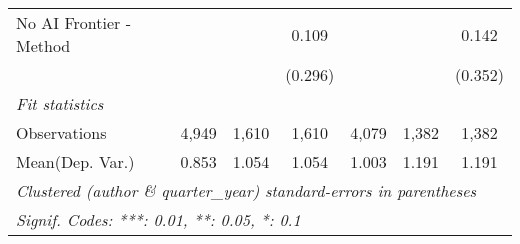 \begin{tabular}{lcccccc}
   No AI Frontier - Method &               &             & 0.109        &               &         & 0.142\\   
                           &               &             & (0.296)      &               &         & (0.352)\\   
   \midrule
   \emph{Fit statistics}\\
   Observations            & 4,949         & 1,610       & 1,610        & 4,079         & 1,382   & 1,382\\  
Mean(Dep. Var.) & 0.853 & 1.054 & 1.054 & 1.003 & 1.191 & 1.191 \\
   \midrule \midrule
   \multicolumn{7}{l}{\emph{Clustered (author \& quarter\_year) standard-errors in parentheses}}\\
   \multicolumn{7}{l}{\emph{Signif. Codes: ***: 0.01, **: 0.05, *: 0.1}}\\
\end{tabular}
\par\endgroup
